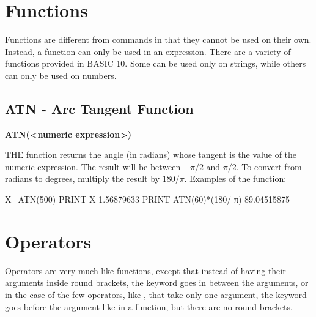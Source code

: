 %


\newpage
\section{Functions}

Functions are different from commands in that they cannot be used on their own.
Instead, a function can only be used in an expression.
There are a variety of functions provided in BASIC 10.
Some can be used only on strings, while others can only be used on numbers.


\subsection{ATN - Arc Tangent Function}

{\bf ATN(<numeric expression>)}

THE  function returns the angle (in radians) whose tangent is the value of the numeric expression.
The result will be between $-\pi/2$ and $\pi/2$.
To convert from radians to degrees, multiply the result by $180/\pi$.
Examples of the  function:


\begin{screenoutput}
  X=ATN(500)
  PRINT X
  1.56879633
  PRINT ATN(60)*(180/ π)
  89.04515875
\end{screenoutput}

\section{Operators}

Operators are very much like functions, except that instead of having their arguments inside round brackets,
the keyword goes in between the arguments, or in the case of the few operators, like , that take only one argument,
the keyword goes before the argument like in a function, but there are no round brackets.


